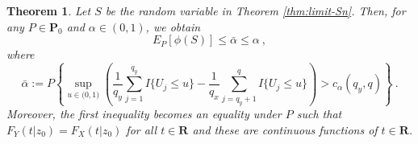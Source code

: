 \documentclass[11pt]{article}
\numberwithin{equation}{section}
\newtheorem{theorem}{Theorem}%
\begin{document}
\begin{theorem}\label{thm:limit-cont}
Let $S$ be the random variable in Theorem \ref{thm:limit-Sn}. Then, for any $P\in \mathbf P_0$ and $\alpha\in(0,1)$, we obtain 
\[
E_P[ \phi (S)] \leq \bar{\alpha}\le \alpha ~,
\]
where 
\begin{equation}
    \bar{\alpha} := P\left\lbrace \sup_{u\in\mathbf (0,1)} \left(\frac{1}{q_y}\sum_{j=1}^{q_y} I\{U_{j} \le u\}-\frac{1}{q_x}\sum_{j=q_y+1}^{q} I\{U_{j} \le u\} \right) > c_{\alpha}(q_y,q) \right\rbrace ~.
\end{equation}
Moreover, the first inequality becomes an equality under $P$ such that  $F_Y(t|z_{0})=F_X(t|z_{0})$ for all $t\in \mathbf R$ and these are continuous functions of $t\in \mathbf R$.
\end{theorem}
\end{document}
